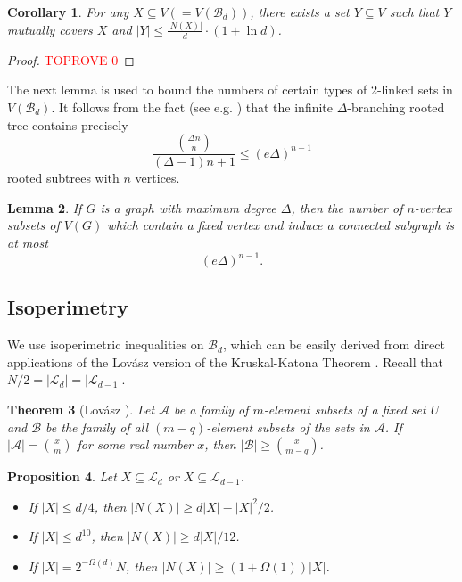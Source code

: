 \documentclass{amsart}
\newtheorem{thm}{Theorem}[section]
\newtheorem{prop}[thm]{Proposition}
\newtheorem{cor}[thm]{Corollary}
\newtheorem{lem}[thm]{Lemma}
\theoremstyle{definition}
\newcommand{\gO}{\Omega}
\newcommand{\cA}{\mathcal{A} }
\newcommand{\cB}{\mathcal{B} }
\newcommand{\cL}{\mathcal{L} }
\newcommand{\beq}[1]{\begin{equation}\label{#1}}
\newcommand{\enq}[0]{\end{equation}}
\newcommand{\0}[0]{\emptyset}
\begin{document}
\begin{cor}\label{cor:cover}
For any $X\subseteq V (=V(\cB_d))$, there exists a set $Y\subseteq V$ such that $Y$ mutually covers $X$ and $|Y|\leq \frac{|N(X)|}{d}\cdot (1 + \ln d)$.
\end{cor}
\begin{proof}\textcolor{red}{TOPROVE 0}\end{proof}




The next lemma is used to bound the numbers of certain types of 2-linked sets in $V(\cB_d)$.
It follows from the fact (see e.g. \cite[p.\ 396, Ex.11]{Knuth}) that the
infinite $\Delta$-branching rooted tree contains precisely
\[\frac{{{\Delta n} \choose n}}{(\Delta-1)n+1} \le (e\Delta)^{n-1}\]
rooted subtrees with $n$ vertices.

\begin{lem}\label{lem:numlinkset}
If $G$ is a graph with maximum degree $\Delta$, then the number of $n$-vertex
subsets of $V(G)$ which contain a fixed vertex and induce a connected subgraph is at most 
\beq{eq:numlinkset}(e\Delta)^{n-1}.\enq
\end{lem}



\subsection{Isoperimetry}

We use isoperimetric inequalities on $\cB_d$, which can be easily derived from direct applications of the Lov\'asz version of the Kruskal-Katona Theorem \cite{Katona, Kruskal}. Recall that $N/2=|\cL_d|=|\cL_{d-1}|$.

\begin{thm}[Lov\'asz \cite{Lovasz}]\label{thm.Lovasz} Let $\cA$ be a family of $m$-element subsets of a fixed set $U$ and $\cB$ be the family of all $(m-q)$-element subsets of the sets in $\cA$. If $|\cA|={x \choose m}$ for some real number $x$, then $|\cB| \ge {x \choose m-q}$.
\end{thm}

\begin{prop}\label{lem:isoper}
Let $X \subseteq \mathcal{L}_d$ or $X\subseteq \mathcal{L}_{d-1}$.
\begin{itemize}
\item[\rm (i)] If $|X|\leq d/4$, then $|N(X)|\geq d|X| - |X|^2/2$.

\item[\rm (ii)] If $|X|\leq d^{10}$, then $|N(X)|\geq d|X|/12$.

\item[\rm (iii)] If $|X|=2^{-\gO(d)}N$, then $|N(X)| \ge (1+\gO(1))|X|$.


\end{itemize}
\end{prop}
\end{document}
